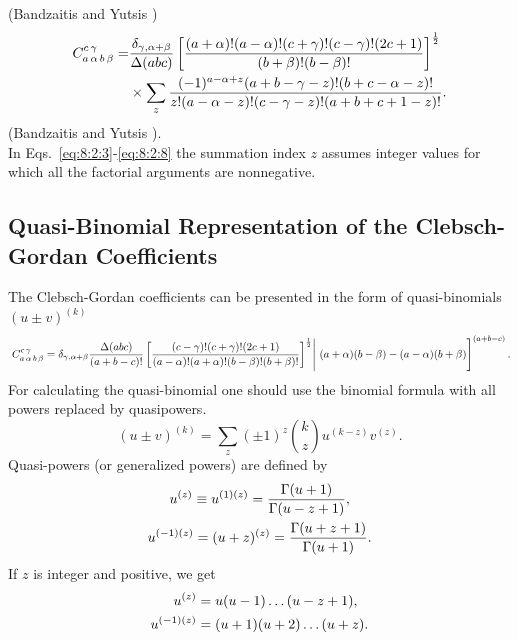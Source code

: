 (Bandzaitis and Yutsis \cite{ref051})
\begin{align}
C_{a\,\alpha\,b\,\beta}^{c\,\gamma}= & \frac{\delta_{\gamma, \alpha+\beta}}{\Delta(a b c)}\left[\frac{(a+\alpha)!(a-\alpha)!(c+\gamma)!(c-\gamma)!(2 c+1)}{(b+\beta)!(b-\beta)!}\right]^{\frac{1}{2}}  \notag\\
& \times \sum_{z} \frac{(-1)^{a-\alpha+z}(a+b-\gamma-z)!(b+c-\alpha-z)!}{z!(a-\alpha-z)!(c-\gamma-z)!(a+b+c+1-z)!}. \label{eq:8:2:8}
\end{align}
(Bandzaitis and Yutsis \cite{ref051}).\\
In Eqs.~\eqref{eq:8:2:3}-\eqref{eq:8:2:8} the summation index $z$ assumes integer values for which all the factorial arguments are nonnegative.

\subsection{Quasi-Binomial Representation of the Clebsch-Gordan Coefficients}\label{sec:8.2.2}
The Clebsch-Gordan coefficients can be presented in the form of quasi-binomials $(u \pm v)^{(k)}$ \cite{ref048}
\begin{equation}
\left.\left.C_{a\,\alpha\,b\,\beta}^{c\,\gamma}=\delta_{\gamma, \alpha+\beta} \frac{\Delta(a b c)}{(a+b-c)!}\left[\frac{(c-\gamma)!(c+\gamma)!(2 c+1)}{(a-\alpha)!(a+\alpha)!(b-\beta)!(b+\beta)!}\right]^{\frac{1}{2}} \right\rvert\,(a+\alpha)(b-\beta)-(a-\alpha)(b+\beta)\right]^{(a+b-c)} . \label{eq:8:2:9}
\end{equation}
For calculating the quasi-binomial one should use the binomial formula with all powers replaced by quasipowers.
\begin{equation}
(u \pm v)^{(k)}=\sum_{z}( \pm 1)^{z}\binom{k}{z} u^{(k-z)} v^{(z)}. \label{eq:8:2:10}
\end{equation}
Quasi-powers (or generalized powers) are defined by
\begin{gather}
u^{(z)} \equiv u^{(1)(z)}=\frac{\Gamma(u+1)}{\Gamma(u-z+1)}, \notag\\
u^{(-1)(z)}=(u+z)^{(z)}=\frac{\Gamma(u+z+1)}{\Gamma(u+1)}. \label{eq:8:2:11}
\end{gather}
If $z$ is integer and positive, we get
\begin{align}
u^{(z)} & =u(u-1) \ldots(u-z+1), \notag\\
u^{(-1)(z)} & =(u+1)(u+2) \ldots(u+z). \label{eq:8:2:12}
\end{align}

